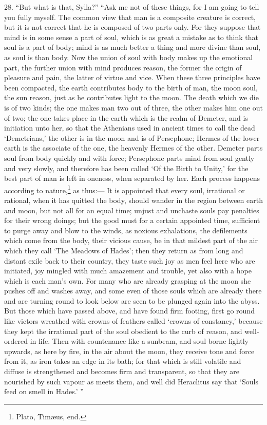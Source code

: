 \documentclass[a4paper, 11pt, oneside, polutonikogreek, english]{article}
\begin{document}
28. ``But what is that, Sylla?'' ``Ask me not of these things, for I am going to tell you fully myself. The common view that man is a composite creature is correct, but it is not correct that he is composed of two parts only. For they suppose that mind is in some sense a part of soul, which is as great a mistake as to think that soul is a part of body; mind is as much better a thing and more divine than soul, as soul is than body. Now the union of soul with body makes up the emotional part, the further union with mind produces reason, the former the origin of pleasure and pain, the latter of virtue and vice. When these three principles have been compacted, the earth contributes body to the birth of man, the moon soul, the sun reason, just as he contributes light to the moon. The death which we die is of two kinds; the one makes man two out of three, the other makes him one out of two; the one takes place in the earth which is the realm of Demeter, and is initiation unto her, so that the Athenians used in ancient times to call the dead `Demetrians,' the other is in the moon and is of Persephone; Hermes of the lower earth is the associate of the one, the heavenly Hermes of the other. Demeter parts soul from body quickly and with force; Persephone parts mind from soul gently and very slowly, and therefore has been called `Of the Birth to Unity,' for the best part of man is left in oneness, when separated by her. Each process happens according to nature,\footnote{Plato, Timæus, end.} as thus:--- It is appointed that every soul, irrational or rational, when it has quitted the body, should wander in the region between earth and moon, but not all for an equal time; unjust and unchaste souls pay penalties for their wrong doings; but the good must for a certain appointed time, sufficient to purge away and blow to the winds, as noxious exhalations, the defilements which come from the body, their vicious cause, be in that mildest part of the air which they call `The Meadows of Hades'; then they return as from long and distant exile back to their country, they taste such joy as men feel here who are initiated, joy mingled with much amazement and trouble, yet also with a hope which is each man's own. For many who are already grasping at the moon she pushes off and washes away, and some even of those souls which are already there and are turning round to look below are seen to be plunged again into the abyss. But those which have passed above, and have found firm footing, first go round like victors wreathed with crowns of feathers called `crowns of constancy,' because they kept the irrational part of the soul obedient to the curb of reason, and well-ordered in life. Then with countenance like a sunbeam, and soul borne lightly upwards, as here by fire, in the air about the moon, they receive tone and force from it, as iron takes an edge in its bath; for that which is still volatile and diffuse is strengthened and becomes firm and transparent, so that they are nourished by such vapour as meets them, and well did Heraclitus say that `Souls feed on smell in Hades.' ''
\end{document}
